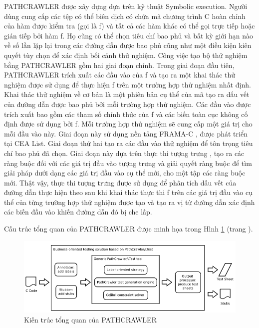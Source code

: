 \documentclass[12pt,a4paper]{report}
\begin{document}
\indent PATHCRAWLER được xây dựng dựa trên kỹ thuật Symbolic execution. Người dùng cung cấp các tệp có thể biên dịch có chứa mã chương trình C hoàn chỉnh của hàm được kiểm tra (gọi là f) và tất cả các hàm khác có thể gọi trực tiếp hoặc gián tiếp bởi hàm f. Họ cũng có thể chọn tiêu chí bao phủ và bất kỳ giới hạn nào về số lần lặp lại trong các đường dẫn được bao phủ cũng như một điều kiện kiên quyết tùy chọn để xác định bối cảnh thử nghiệm. Công việc tạo bộ thử nghiệm bằng PATHCRAWLER gồm hai giai đoạn chính. Trong giai đoạn đầu tiên, PATHCRAWLER trích xuất các đầu vào của f và tạo ra một khai thác thử nghiệm được sử dụng để thực hiện f trên một trường hợp thử nghiệm nhất định. Khai thác thử nghiệm về cơ bản là một phiên bản cụ thể của mã tạo ra dấu vết của đường dẫn được bao phủ bởi mỗi trường hợp thử nghiệm. Các đầu vào được trích xuất bao gồm các tham số chính thức của f và các biến toàn cục không cố định được sử dụng bởi f. Mỗi trường hợp thử nghiệm sẽ cung cấp một giá trị cho mỗi đầu vào này. Giai đoạn này sử dụng nền tảng FRAMA-C \cite{kirchner2015frama}, được phát triển tại CEA List. Giai đoạn thứ hai tạo ra các đầu vào thử nghiệm để tôn trọng tiêu chí bao phủ đã chọn.  Giai đoạn này dựa trên thực thi tượng trưng , tạo ra các ràng buộc đối với các giá trị đầu vào tượng trưng và giải quyết ràng buộc để tìm giải pháp dưới dạng các giá trị đầu vào cụ thể mới, cho một tập các ràng buộc mới. Thật vậy, thực thi tượng trưng được sử dụng để phân tích dấu vết của đường dẫn thực hiện theo sau khi khai thác thực thi f trên các giá trị đầu vào cụ thể của từng trường hợp thử nghiệm được tạo và tạo ra vị từ đường dẫn xác định các biến đầu vào khiến đường dẫn đó bị che lấp.

Cấu trúc tổng quan của PATHCRAWLER được minh họa trong Hình \ref{refhinh6} (trang \pageref{refhinh6}).

\begin{figure}[ht]
\begin{center}
\includegraphics[scale=0.7]{hinhanh/pathcrawler}
\end{center}
\caption{Kiến trúc tổng quan của PATHCRAWLER}
\label{refhinh6}
\end{figure}
\end{document}
